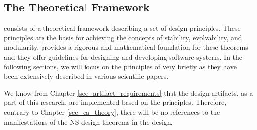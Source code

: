 \subsection{The Theoretical Framework} \label{subsec_ns_desing_theorems}

\ns consists of a theoretical framework describing a set of design principles. These
principles are the basis for achieving the concepts of stability, evolvability, and
modularity. \ns provides a rigorous and mathematical foundation for these theorems
and they offer guidelines for designing and developing software systems. In the following
sections, we will focus on the principles of \ns very briefly as they have been
extensively described in various scientific papers.

We know from Chapter \ref{sec_artifact_requirements} that the design artifacts, as a part
of this research, are implemented based on the \ca principles. Therefore, contrary to
Chapter \ref{sec_ca_theory}, there will be no references to the manifestations of the NS
design theorems in the design.